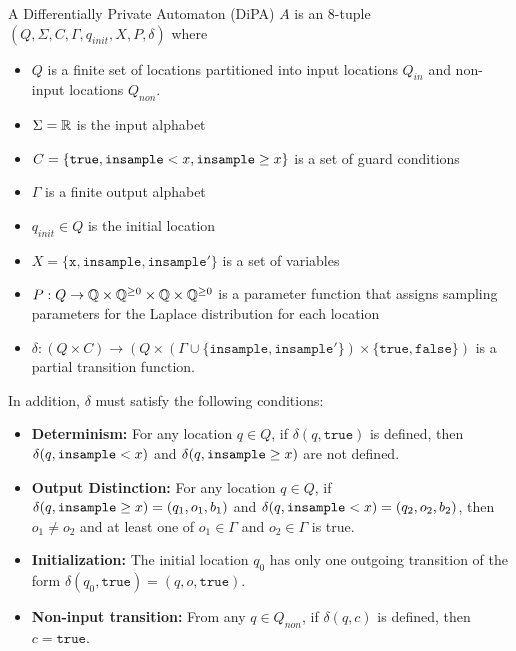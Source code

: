 \begin{defn}
    A Differentially Private Automaton (DiPA) $A$ is an 8-tuple $(Q, \Sigma, C, \Gamma, q_{init}, X, P, \delta)$ where
    \begin{itemize}
        \item $Q$ is a finite set of locations partitioned into input locations $Q_{in}$ and non-input locations $Q_{non}$. 
        \item $\Sigma = \mathbb{R}$ is the input alphabet
        \item $C = \{\texttt{true}, \texttt{insample} < x, \texttt{insample}\geq x\}$ is a set of guard conditions
        \item $\Gamma$ is a finite output alphabet
        \item $q_{init}\in Q$ is the initial location
        \item $X = \{\texttt{x}, \texttt{insample}, \texttt{insample}'\}$ is a set of variables
        \item $P: Q\to \mathbb{Q}\times \mathbb{Q}^{\geq 0}\times \mathbb{Q}\times  \mathbb{Q}^{\geq 0}$ is a parameter function that assigns sampling parameters for the Laplace distribution for each location
        \item $\delta:(Q\times C)\to (Q\times (\Gamma \cup \{\texttt{insample}, \texttt{insample}'\})\times \{\texttt{true}, \texttt{false}\})$ is a partial transition function. 
    \end{itemize}
    In addition, $\delta$ must satisfy the following conditions:
    \begin{itemize}
        \item \textbf{Determinism:} For any location $q\in Q$, if $\delta(q,\texttt{true})$ is defined, then $\delta(q,\texttt{insample} < x)$ and $\delta(q,\texttt{insample}\geq x)$ are not defined. 

        \item \textbf{Output Distinction:} For any location $q\in Q$, if $\delta(q, \texttt{insample}\geq x) = (q_1, o_1, b_1)$ and $\delta(q, \texttt{insample} < x) = (q_2, o_2, b_2)$, then $o_1\neq o_2$ and at least one of $o_1\in \Gamma$ and $o_2\in \Gamma$ is true.

        \item \textbf{Initialization:} The initial location $q_0$ has only one outgoing transition of the form $\delta(q_0, \texttt{true}) = (q, o, \texttt{true})$.

        \item \textbf{Non-input transition:} From any $q\in Q_{non}$, if $\delta(q, c)$ is defined, then $c=\texttt{true}$.
    \end{itemize}
\end{defn}

